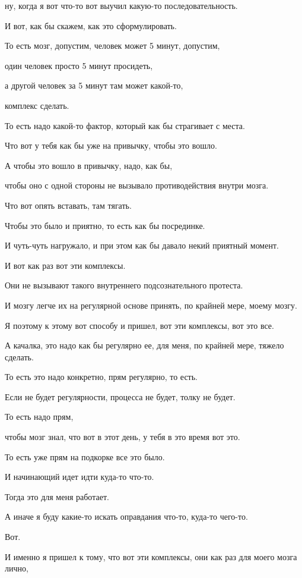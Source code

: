ну, когда я вот что-то вот выучил какую-то последовательность.

И вот, как бы скажем, как это сформулировать.

То есть мозг, допустим, человек может 5 минут, допустим,

один человек просто 5 минут просидеть,

а другой человек за 5 минут там может какой-то,

комплекс сделать.

То есть надо какой-то фактор, который как бы страгивает с места.

Что вот у тебя как бы уже на привычку, чтобы это вошло.

А чтобы это вошло в привычку, надо, как бы,

чтобы оно с одной стороны не вызывало противодействия внутри мозга.

Что вот опять вставать, там тягать.

Чтобы это было и приятно, то есть как бы посрединке.

И чуть-чуть нагружало, и при этом как бы давало некий приятный момент.

И вот как раз вот эти комплексы.

Они не вызывают такого внутреннего подсознательного протеста.

И мозгу легче их на регулярной основе принять, по крайней мере, моему мозгу.

Я поэтому к этому вот способу и пришел, вот эти комплексы, вот это все.

А качалка, это надо как бы регулярно ее, для меня, по крайней мере, тяжело сделать.

То есть это надо конкретно, прям регулярно, то есть.

Если не будет регулярности, процесса не будет, толку не будет.

То есть надо прям,

чтобы мозг знал, что вот в этот день, у тебя в это время вот это.

То есть уже прям на подкорке все это было.

И начинающий идет идти куда-то что-то.

Тогда это для меня работает.

А иначе я буду какие-то искать оправдания что-то, куда-то чего-то.

Вот.

И именно я пришел к тому, что вот эти комплексы, они как раз для моего мозга лично,

